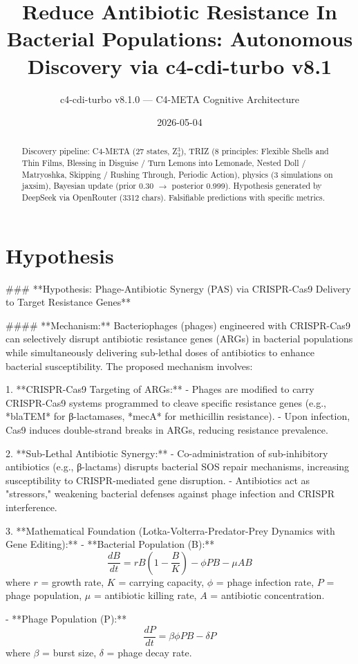 \documentclass[12pt]{article}
\title{Reduce Antibiotic Resistance In Bacterial Populations: Autonomous Discovery via c4-cdi-turbo v8.1}
\author{c4-cdi-turbo v8.1.0 — C4-META Cognitive Architecture}
\date{2026-05-04}
\begin{document}
\maketitle
\begin{abstract}
Discovery pipeline: C4-META (27 states, Z$_3^3$), TRIZ (8 principles: Flexible Shells and Thin Films, Blessing in Disguise / Turn Lemons into Lemonade, Nested Doll / Matryoshka, Skipping / Rushing Through, Periodic Action), 
physics (3 simulations on jaxsim), Bayesian update (prior 0.30 $\rightarrow$ posterior 0.999).
Hypothesis generated by DeepSeek via OpenRouter (3312 chars). 
Falsifiable predictions with specific metrics.
\end{abstract}
\section{Hypothesis}
### **Hypothesis: Phage-Antibiotic Synergy (PAS) via CRISPR-Cas9 Delivery to Target Resistance Genes**  

#### **Mechanism:**  
Bacteriophages (phages) engineered with CRISPR-Cas9 can selectively disrupt antibiotic resistance genes (ARGs) in bacterial populations while simultaneously delivering sub-lethal doses of antibiotics to enhance bacterial susceptibility. The proposed mechanism involves:  

1. **CRISPR-Cas9 Targeting of ARGs:**  
   - Phages are modified to carry CRISPR-Cas9 systems programmed to cleave specific resistance genes (e.g., *blaTEM* for β-lactamases, *mecA* for methicillin resistance).  
   - Upon infection, Cas9 induces double-strand breaks in ARGs, reducing resistance prevalence.  

2. **Sub-Lethal Antibiotic Synergy:**  
   - Co-administration of sub-inhibitory antibiotics (e.g., β-lactams) disrupts bacterial SOS repair mechanisms, increasing susceptibility to CRISPR-mediated gene disruption.  
   - Antibiotics act as "stressors," weakening bacterial defenses against phage infection and CRISPR interference.  

3. **Mathematical Foundation (Lotka-Volterra-Predator-Prey Dynamics with Gene Editing):**  
   - **Bacterial Population (B):**  
     \[
     \frac{dB}{dt} = rB \left(1 - \frac{B}{K}\right) - \phi P B - \mu A B
     \]  
     where \( r \) = growth rate, \( K \) = carrying capacity, \( \phi \) = phage infection rate, \( P \) = phage population, \( \mu \) = antibiotic killing rate, \( A \) = antibiotic concentration.  

   - **Phage Population (P):**  
     \[
     \frac{dP}{dt} = \beta \phi P B - \delta P
     \]  
     where \( \beta \) = burst size, \( \delta \) = phage decay rate.  
\end{document}
